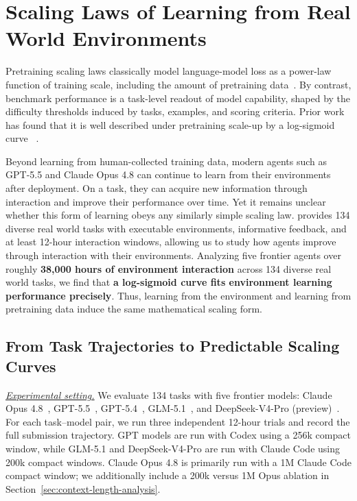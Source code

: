 \section{Scaling Laws of Learning from Real World Environments}
\label{sec:emerging-scaling}

Pretraining scaling laws classically model language-model loss as a power-law
function of training scale, including the amount of pretraining
data~\citep{kaplan2020scaling,hoffmann2022training}. By contrast, benchmark
performance is a task-level readout of model capability, shaped by the
difficulty thresholds induced by tasks, examples, and scoring criteria. Prior
work has found that it is well described under pretraining scale-up by a
log-sigmoid curve
~\citep{dubey2024llama3,bhagia2024taskscaling,owen2024predictable,
ruan2024observational}.

Beyond learning from human-collected training data, modern agents such as
GPT-5.5 and Claude Opus 4.8 can continue to learn from their environments after
deployment. On a
task, they can acquire new information through interaction and improve their
performance over time. Yet it remains
unclear whether this form of learning obeys any similarly simple scaling law.
\benchmark{} provides 134 diverse real world tasks with executable
environments, informative feedback, and at least 12-hour interaction windows, allowing
us to study how agents improve through interaction with their environments.
Analyzing five frontier agents over roughly \textbf{38,000 hours of environment
interaction} across 134 diverse real world tasks, we find that \textbf{a
log-sigmoid curve fits environment learning performance precisely}. Thus,
learning from the environment and learning from pretraining data induce the
same mathematical scaling form.

\subsection{From Task Trajectories to Predictable Scaling Curves}
\label{sec:environment-learning-data}

\underline{\textit{Experimental setting.}} We evaluate 134 \benchmark{} tasks
with five frontier models: Claude Opus 4.8~\cite{anthropic2026claudeopus48systemcard}, GPT-5.5~\cite{openai2026gpt55systemcard}, GPT-5.4~\cite{openai2026gpt54thinkingsystemcard}, GLM-5.1~\cite{zai2026glm51,glm5team2026glm5report}, and
DeepSeek-V4-Pro (preview)~\cite{deepseekai2026deepseekv4}. For each task--model pair, we run three independent 12-hour trials and record the
full submission trajectory. GPT models are run with Codex using a 256k compact
window, while GLM-5.1 and DeepSeek-V4-Pro are run with Claude Code using 200k
compact windows. Claude Opus 4.8 is primarily run with a 1M Claude Code compact
window; we additionally include a 200k versus 1M Opus ablation in
Section~\ref{sec:context-length-analysis}.

